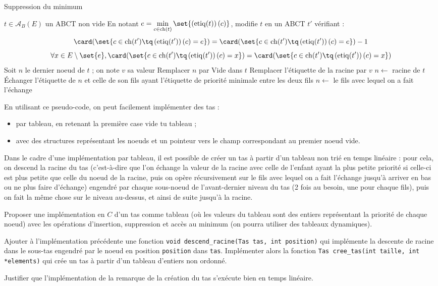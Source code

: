 \documentclass{scrartcl}
\begin{document}
			\begin{algorithm}[H]
				\caption{Suppression du minimum}
				\Entree
				{
					$t \in \mathscr{A}_B(E)$ un ABCT non vide
				}
				\Sortie
				{
					En notant $e = \min\limits_{c \in \mathrm{ch}(t)} \set{\left(\mathrm{etiq}(t)\right)(c)}$,
					modifie $t$ en un ABCT $t'$ vérifiant :
					\[
						\card(\set{c \in \mathrm{ch}(t') \tq \left(\mathrm{etiq}(t')\right)(c) = e}) = \card(\set{c \in \mathrm{ch}(t') \tq \left(\mathrm{etiq}(t')\right)(c) = e}) - 1
					\]
					\[
						\forall x \in E\setminus\set{e}, \card(\set{c \in \mathrm{ch}(t') \tq \left(\mathrm{etiq}(t')\right)(c) = x}) = \card(\set{c \in \mathrm{ch}(t') \tq \left(\mathrm{etiq}(t')\right)(c) = x})
					\]
				}
				Soit $n$ le dernier noeud de $t$ ; on note $v$ sa valeur \;
				Remplacer $n$ par Vide dans $t$ \;
				Remplacer l'étiquette de la racine par $v$ \;
				$n \leftarrow$ racine de $t$ \;
				{
					Échanger l'étiquette de $n$ et celle de son fils ayant l'étiquette de priorité minimale entre les deux fils \;
					$n \leftarrow$ le fils avec lequel on a fait l'échange
				}
			\end{algorithm}

			En utilisant ce pseudo-code, on peut facilement implémenter des tas : 
			\begin{itemize}
				\item par tableau, en retenant la première case vide tu tableau ;
				\item avec des structures représentant les noeuds et un pointeur vers le champ correspondant au premier noeud vide.
			\end{itemize}

			\rem Dans le cadre d'une implémentation par tableau, il est possible de créer un tas à partir d'un tableau non trié en temps linéaire : pour cela,
				on descend la racine du tas (c'est-à-dire que l'on échange la valeur de la racine avec celle de l'enfant ayant la plus petite priorité si celle-ci est plus petite que celle du noeud de la racine, puis on opère récursivement sur le fils avec lequel on a fait l'échange jusqu'à arriver en bas ou ne plus faire d'échange) engendré par chaque sous-noeud de l'avant-dernier niveau du tas (2 fois au besoin, une pour chaque fils), puis on fait la même chose sur le niveau au-dessus, et ainsi de suite jusqu'à la racine.

			\exo Proposer une implémentation en $C$ d'un tas comme tableau (où les valeurs du tableau sont des entiers représentant la priorité de chaque noeud) avec les opérations d'insertion, suppression et accès au minimum (on pourra utiliser des tableaux dynamiques).

			\exo Ajouter à l'implémentation précédente une fonction \texttt{void descend\_racine(Tas tas, int position)} qui implémente la descente de racine dans le sous-tas engendré par le noeud en position \texttt{position} dans \texttt{tas}. Implémenter alors la fonction \texttt{Tas cree\_tas(int taille, int *elements)} qui crée un tas à partir d'un tableau d'entiers non ordonné.

			\exo Justifier que l'implémentation de la remarque de la création du tas s'exécute bien en temps linéaire.
\end{document}
